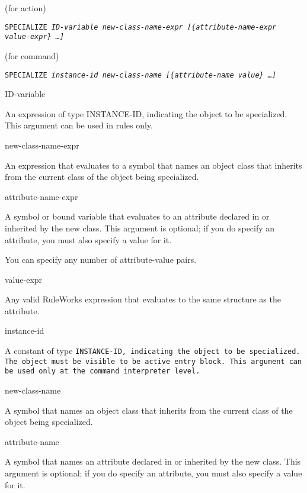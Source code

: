 {{\Format (for action)

\tt{SPECIALIZE} \it{ID-variable} \it{new-class-name-expr}
[\{\it{attribute-name-expr} \it{value-expr}\} \ldots]

\Format (for command)

\tt{SPECIALIZE} \it{instance-id} \it{new-class-name}
[\{\it{attribute-name} \it{value}\} \ldots]

\begin{arguments}
\item[ID-variable]

  An expression of type INSTANCE-ID, indicating the object to be
  specialized. This argument can be used in rules only.

\item[new-class-name-expr]

  An expression that evaluates to a symbol that names an object class
  that inherits from the current class of the object being
  specialized.

\item[attribute-name-expr]

  A symbol or bound variable that evaluates to an attribute declared
  in or inherited by the new class. This argument is optional; if you
  do specify an attribute, you must also specify a value for it.

  You can specify any number of attribute-value pairs.

\item[value-expr]

  Any valid RuleWorks expression that evaluates to the same structure
  as the attribute.

\item[instance-id]

  A constant of type \tt{INSTANCE-ID}, indicating the object to be
  specialized. The object must be visible to be active entry
  block. This argument can be used only at the command interpreter
  level.

\item[new-class-name]

  A symbol that names an object class that inherits from the current
  class of the object being specialized.

\item[attribute-name]

  A symbol that names an attribute declared in or inherited by the new
  class. This argument is optional; if you do specify an attribute,
  you must also specify a value for it.


\end{arguments}}}
